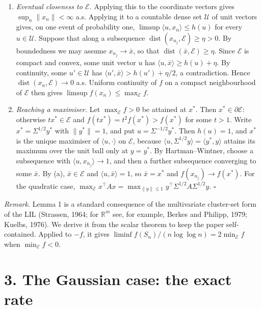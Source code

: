 \documentclass[
  10pt,
  a4paper,
]{article}
\begin{document}
\begin{enumerate}
\def\labelenumi{(\alph{enumi})}
\item
  \emph{Eventual closeness to \(\mathcal E\).} Applying this to the
  coordinate vectors gives \(\sup_n\|x_n\|<\infty\) a.s. Applying it to
  a countable dense set \(\mathcal U\) of unit vectors gives, on one
  event of probability one, \(\limsup\langle u,x_n\rangle\le h(u)\) for
  every \(u\in\mathcal U\). Suppose that along a subsequence
  \(\operatorname{dist}(x_{n_j},\mathcal E)\ge\eta>0\). By boundedness
  we may assume \(x_{n_j}\to\bar x\), so that
  \(\operatorname{dist}(\bar x,\mathcal E)\ge\eta\). Since
  \(\mathcal E\) is compact and convex, some unit vector \(u\) has
  \(\langle u,\bar x\rangle\ge h(u)+\eta\). By continuity, some
  \(u'\in\mathcal U\) has \(\langle u',\bar x\rangle>h(u')+\eta/2\), a
  contradiction. Hence \(\operatorname{dist}(x_n,\mathcal E)\to0\) a.s.
  Uniform continuity of \(f\) on a compact neighbourhood of
  \(\mathcal E\) then gives \(\limsup f(x_n)\le\max_{\mathcal E}f\).
\item
  \emph{Reaching a maximiser.} Let \(\max_{\mathcal E}f>0\) be attained
  at \(x^*\). Then \(x^*\in\partial\mathcal E\): otherwise
  \(tx^*\in\mathcal E\) and \(f(tx^*)=t^2f(x^*)>f(x^*)\) for some
  \(t>1\). Write \(x^*=\Sigma^{1/2}y^*\) with \(\|y^*\|=1\), and put
  \(u=\Sigma^{-1/2}y^*\). Then \(h(u)=1\), and \(x^*\) is the unique
  maximiser of \(\langle u,\cdot\rangle\) on \(\mathcal E\), because
  \(\langle u,\Sigma^{1/2}y\rangle=\langle y^*,y\rangle\) attains its
  maximum over the unit ball only at \(y=y^*\). By Hartman--Wintner,
  choose a subsequence with \(\langle u,x_{n_j}\rangle\to1\), and then a
  further subsequence converging to some \(\bar x\). By (a),
  \(\bar x\in\mathcal E\) and \(\langle u,\bar x\rangle=1\), so
  \(\bar x=x^*\) and \(f(x_{n_j})\to f(x^*)\). For the quadratic case,
  \(\max_{\mathcal E}x^\top Ax=\max_{\|y\|\le1}y^\top\Sigma^{1/2}A\Sigma^{1/2}y\).
  \(\square\)
\end{enumerate}

\emph{Remark.} Lemma 1 is a standard consequence of the multivariate
cluster-set form of the LIL (Strassen, 1964; for \(\mathbb R^m\) see,
for example, Berkes and Philipp, 1979; Kuelbs, 1976). We derive it from
the scalar theorem to keep the paper self-contained. Applied to \(-f\),
it gives \(\liminf f(S_n)/(n\log\log n)=2\min_{\mathcal E}f\) when
\(\min_{\mathcal E}f<0\).

\section{3. The Gaussian case: the exact
rate}\label{the-gaussian-case-the-exact-rate}
\end{document}
